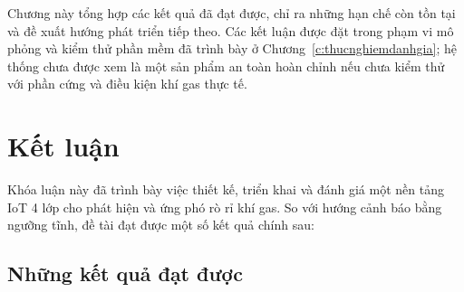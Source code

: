 
Chương này tổng hợp các kết quả đã đạt được, chỉ ra những hạn chế còn tồn tại và đề xuất hướng phát triển tiếp theo. Các kết luận được đặt trong phạm vi mô phỏng và kiểm thử phần mềm đã trình bày ở Chương~\ref{c:thucnghiemdanhgia}; hệ thống chưa được xem là một sản phẩm an toàn hoàn chỉnh nếu chưa kiểm thử với phần cứng và điều kiện khí gas thực tế.

\section{Kết luận}

Khóa luận này đã trình bày việc thiết kế, triển khai và đánh giá một nền tảng IoT 4 lớp cho phát hiện và ứng phó rò rỉ khí gas. So với hướng cảnh báo bằng ngưỡng tĩnh, đề tài đạt được một số kết quả chính sau:

\subsection{Những kết quả đạt được}

